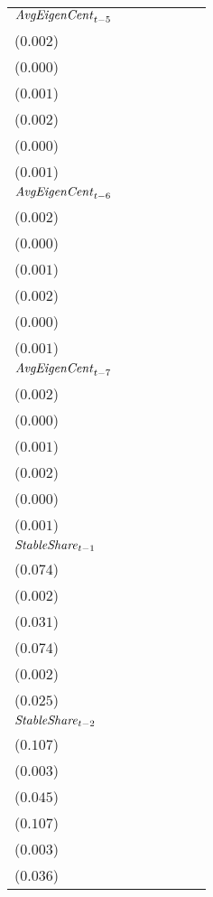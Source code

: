 \begin{tabular}{lllllll}
${\it AvgEigenCent}_{t-5}$ &   \makecell{$0.016^{***}$ \\ ($0.002$)} &     \makecell{$-0.000^{}$ \\ ($0.000$)} &  \makecell{$-0.003^{***}$ \\ ($0.001$)} &   \makecell{$0.015^{***}$ \\ ($0.002$)} &      \makecell{$0.000^{}$ \\ ($0.000$)} &     \makecell{$0.001^{*}$ \\ ($0.001$)} \\
${\it AvgEigenCent}_{t-6}$ &   \makecell{$0.043^{***}$ \\ ($0.002$)} &  \makecell{$-0.000^{***}$ \\ ($0.000$)} &   \makecell{$0.003^{***}$ \\ ($0.001$)} &   \makecell{$0.043^{***}$ \\ ($0.002$)} &  \makecell{$-0.000^{***}$ \\ ($0.000$)} &   \makecell{$-0.002^{**}$ \\ ($0.001$)} \\
${\it AvgEigenCent}_{t-7}$ &   \makecell{$0.052^{***}$ \\ ($0.002$)} &   \makecell{$0.000^{***}$ \\ ($0.000$)} &     \makecell{$-0.000^{}$ \\ ($0.001$)} &   \makecell{$0.052^{***}$ \\ ($0.002$)} &   \makecell{$0.000^{***}$ \\ ($0.000$)} &      \makecell{$0.001^{}$ \\ ($0.001$)} \\
${\it StableShare}_{t-1}$  &   \makecell{$0.652^{***}$ \\ ($0.074$)} &   \makecell{$1.053^{***}$ \\ ($0.002$)} &   \makecell{$0.326^{***}$ \\ ($0.031$)} &   \makecell{$0.659^{***}$ \\ ($0.074$)} &   \makecell{$1.053^{***}$ \\ ($0.002$)} &      \makecell{$0.041^{}$ \\ ($0.025$)} \\
${\it StableShare}_{t-2}$  &  \makecell{$-0.545^{***}$ \\ ($0.107$)} &      \makecell{$0.002^{}$ \\ ($0.003$)} &  \makecell{$-0.569^{***}$ \\ ($0.045$)} &  \makecell{$-0.552^{***}$ \\ ($0.107$)} &      \makecell{$0.002^{}$ \\ ($0.003$)} &  \makecell{$-0.148^{***}$ \\ ($0.036$)} \\

\end{tabular}
